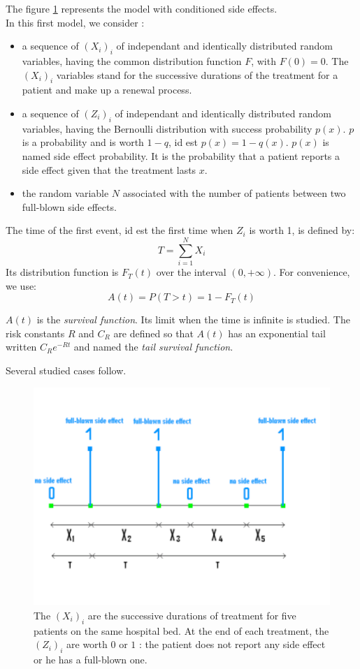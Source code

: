 \documentclass[12pt,twoside]{article}
\begin{document}
The figure \ref{mod1} represents the model with conditioned side effects.\\


In this first model, we consider : 
\begin{itemize}
	\item a sequence of $(X_i)_i$ of independant and identically distributed random variables, having the 
		common distribution function $F$, with $F(0)=0$.
		The $(X_i)_i$ variables stand for the successive durations of the treatment for a patient and make up a renewal process.
	\item a sequence of $(Z_i)_i$ of independant and identically distributed random variables, having the 
		Bernoulli distribution with success probability $p(x)$. $p$ is a probability and is worth $1-q$, id est $p(x)=1-q(x)$.
		$p(x)$ is named side effect probability. It is the probability that a patient reports a side effect given that the treatment lasts $x$.	
	\item the random variable $N$ associated with the number of patients between two full-blown side effects.
\end{itemize}

The time of the first event, id est the first time when $Z_i$ is worth 1, is defined by:
$$T=\sum_{i=1}^{N}{X_i}$$ 
Its distribution function is $F_T(t)$ over the interval $(0,+\infty)$. For convenience, we use:
$$A(t)=P(T>t)=1-F_T(t)$$

$A(t)$ is the \textsl{survival function}. Its limit when the time is infinite is studied. The risk constants $R$ and $C_R$ 
are defined so that $A(t)$ has an exponential tail written $C_R e^{-R t}$ and named the \textsl{tail survival function}.
 

Several studied cases follow.


\begin{figure}[htb!]
\begin{center}
\includegraphics[width=12cm]{mod1.pdf} 

\caption{ The $(X_i)_i$ are the successive durations of treatment for five patients on the same hospital bed. At the end of each treatment, the $(Z_i)_i$ are worth $0$ or $1$ : the patient does not report any side effect or he has a full-blown one. }
\label{mod1}
\end{center}
\end{figure}
\end{document}
